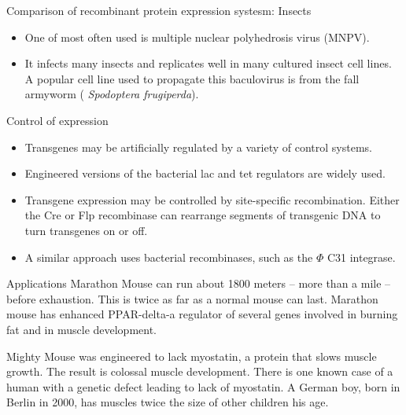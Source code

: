 \documentclass[
  ignorenonframetext,
  aspectratio=169]{beamer}
\providecommand{\tightlist}{%
  \setlength{\itemsep}{0pt}\setlength{\parskip}{0pt}}
\begin{document}
\begin{frame}{Comparison of recombinant protein expression systesm:
Insects}
\protect\hypertarget{comparison-of-recombinant-protein-expression-systesm-insects-1}{}
\begin{itemize}
\tightlist
\item
  One of most often used is multiple nuclear polyhedrosis virus (MNPV).
\item
  It infects many insects and replicates well in many cultured insect
  cell lines. A popular cell line used to propagate this baculovirus is
  from the fall armyworm ( \emph{Spodoptera frugiperda}).
\end{itemize}
\end{frame}

\begin{frame}{Control of expression}
\protect\hypertarget{control-of-expression}{}
\begin{itemize}
\tightlist
\item
  Transgenes may be artificially regulated by a variety of control
  systems.
\item
  Engineered versions of the bacterial lac and tet regulators are widely
  used.
\item
  Transgene expression may be controlled by site-specific recombination.
  Either the Cre or Flp recombinase can rearrange segments of transgenic
  DNA to turn transgenes on or off.
\item
  A similar approach uses bacterial recombinases, such as the \(\Phi\)
  C31 integrase.
\end{itemize}
\end{frame}

\begin{frame}{Applications}
\protect\hypertarget{applications}{}
Marathon Mouse can run about 1800 meters -- more than a mile -- before
exhaustion. This is twice as far as a normal mouse can last. Marathon
mouse has enhanced PPAR-delta-a regulator of several genes involved in
burning fat and in muscle development.

Mighty Mouse was engineered to lack myostatin, a protein that slows
muscle growth. The result is colossal muscle development. There is one
known case of a human with a genetic defect leading to lack of
myostatin. A German boy, born in Berlin in 2000, has muscles twice the
size of other children his age.
\end{frame}
\end{document}
